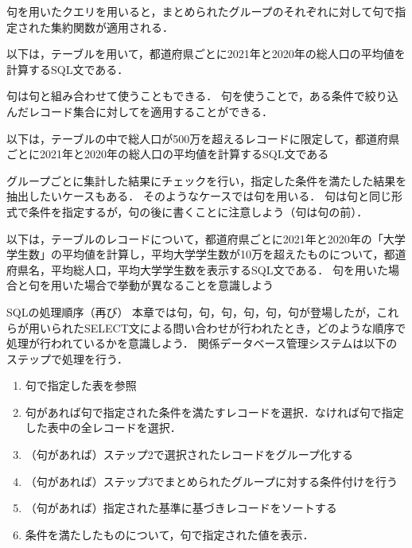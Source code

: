 句を用いたクエリを用いると，まとめられたグループのそれぞれに対して句で指定された集約関数が適用される．

以下は，テーブルを用いて，都道府県ごとに2021年と2020年の総人口の平均値を計算するSQL文である．

句は句と組み合わせて使うこともできる． 句を使うことで，ある条件で絞り込んだレコード集合に対してを適用することができる．

以下は，テーブルの中で総人口が500万を超えるレコードに限定して，都道府県ごとに2021年と2020年の総人口の平均値を計算するSQL文である

グループごとに集計した結果にチェックを行い，指定した条件を満たした結果を抽出したいケースもある．
そのようなケースでは句を用いる．
句は句と同じ形式で条件を指定するが，句の後に書くことに注意しよう（句は句の前）．

以下は，テーブルのレコードについて，都道府県ごとに2021年と2020年の「大学学生数」の平均値を計算し，平均大学学生数が10万を超えたものについて，都道府県名，平均総人口，平均大学学生数を表示するSQL文である．
句を用いた場合と句を用いた場合で挙動が異なることを意識しよう

\begin{notebox}{SQLの処理順序（再び）}
本章では句，句，句，句，句，句が登場したが，これらが用いられたSELECT文による問い合わせが行われたとき，どのような順序で処理が行われているかを意識しよう．
関係データベース管理システムは以下のステップで処理を行う．
\begin{enumerate}
\item {}句で指定した表を参照
\item {}句があれば句で指定された条件を満たすレコードを選択．なければ句で指定した表中の全レコードを選択．
\item （句があれば）ステップ2で選択されたレコードをグループ化する
\item （句があれば）ステップ3でまとめられたグループに対する条件付けを行う
\item （句があれば）指定された基準に基づきレコードをソートする
\item 条件を満たしたものについて，句で指定された値を表示．
\end{enumerate}
\end{notebox}
